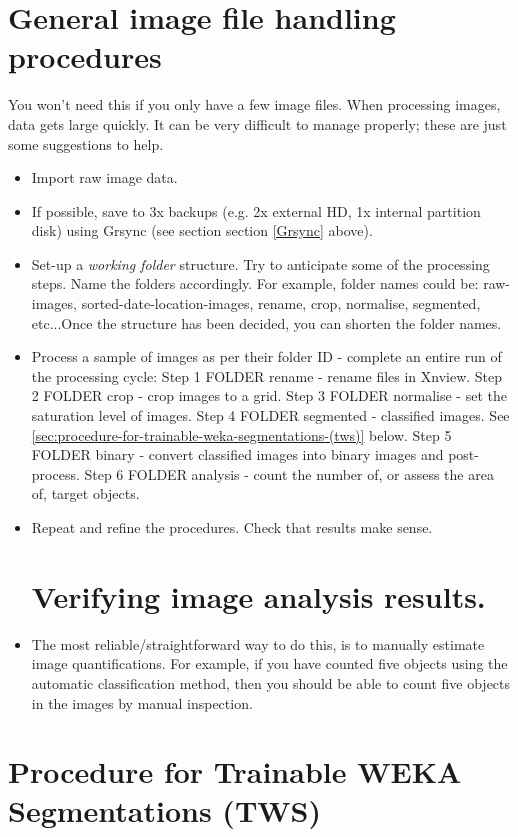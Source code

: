 \documentclass[letterpaper]{article}
\begin{document}
\section{General image file handling procedures}
You won't need this if you only have a few image files. When processing images, data gets large quickly. It can be very difficult to manage properly; these are just some suggestions to help.
\begin{itemize}
\item Import raw image data.
\item If possible, save to 3x backups (e.g. 2x external HD, 1x internal partition disk) using Grsync (see section  section \ref{Grsync} above).
\item Set-up a \emph{working folder} structure. Try to anticipate some of the processing steps. Name the folders accordingly. For example, folder names could be: raw-images, sorted-date-location-images, rename, crop, normalise, segmented, etc...Once the structure has been decided, you can shorten the folder names.
\item Process a sample of images as per their folder ID -  complete an entire run of the processing cycle:
\subitem Step 1 FOLDER rename - rename files in Xnview.
\subitem Step 2 FOLDER crop - crop images to a grid.
\subitem Step 3 FOLDER normalise - set the saturation level of images.
\subitem Step 4 FOLDER segmented - classified images. See \autoref{sec:procedure-for-trainable-weka-segmentations-(tws)} below.
\subitem Step 5 FOLDER binary - convert classified images into binary images and post-process. 
\subitem Step 6 FOLDER analysis - count the number of, or assess the area of, target objects.
\item Repeat and refine the procedures. Check that results make sense.
\section {Verifying image analysis results.}
\item The most reliable/straightforward way to do this, is to manually estimate image  quantifications. For example, if you have counted five objects using the automatic classification method, then you should be able to count five objects in the images by manual inspection.
\end{itemize}

\section{Procedure for Trainable WEKA Segmentations (TWS)}\label{sec:procedure-for-trainable-weka-segmentations-(tws)}
\end{document}
